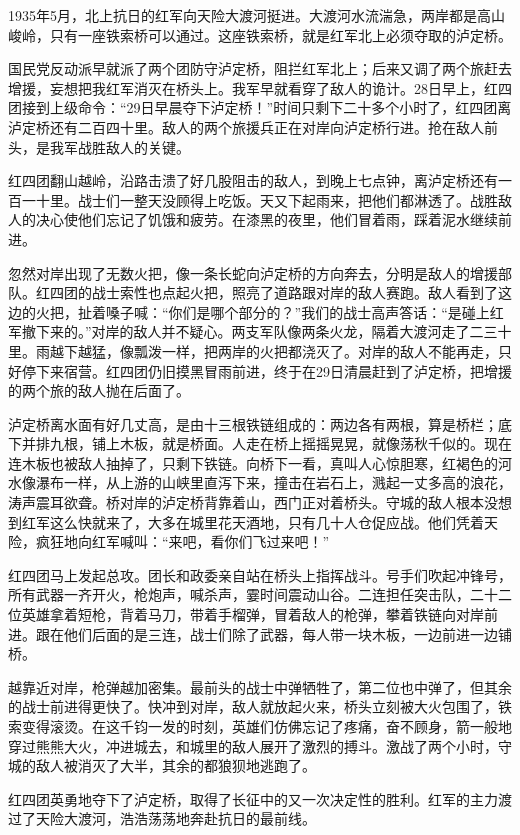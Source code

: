 \documentclass[12pt,UTF-8,openany]{ctexbook}
\begin{document}
\begin{Large}
    
    1935年5月，北上抗日的红军向天险大渡河挺进。大渡河水流湍急，两岸都是高山峻岭，只有一座铁索桥可以通过。这座铁索桥，就是红军北上必须夺取的泸定桥。
    
    国民党反动派早就派了两个团防守泸定桥，阻拦红军北上；后来又调了两个旅赶去增援，妄想把我红军消灭在桥头上。我军早就看穿了敌人的诡计。28日早上，红四团接到上级命令：“29日早晨夺下泸定桥！”时间只剩下二十多个小时了，红四团离泸定桥还有二百四十里。敌人的两个旅援兵正在对岸向泸定桥行进。抢在敌人前头，是我军战胜敌人的关键。
    
    红四团翻山越岭，沿路击溃了好几股阻击的敌人，到晚上七点钟，离泸定桥还有一百一十里。战士们一整天没顾得上吃饭。天又下起雨来，把他们都淋透了。战胜敌人的决心使他们忘记了饥饿和疲劳。在漆黑的夜里，他们冒着雨，踩着泥水继续前进。
    
    忽然对岸出现了无数火把，像一条长蛇向泸定桥的方向奔去，分明是敌人的增援部队。红四团的战士索性也点起火把，照亮了道路跟对岸的敌人赛跑。敌人看到了这边的火把，扯着嗓子喊：“你们是哪个部分的？”我们的战士高声答话：“是碰上红军撤下来的。”对岸的敌人并不疑心。两支军队像两条火龙，隔着大渡河走了二三十里。雨越下越猛，像瓢泼一样，把两岸的火把都浇灭了。对岸的敌人不能再走，只好停下来宿营。红四团仍旧摸黑冒雨前进，终于在29日清晨赶到了泸定桥，把增援的两个旅的敌人抛在后面了。
    
    泸定桥离水面有好几丈高，是由十三根铁链组成的：两边各有两根，算是桥栏；底下并排九根，铺上木板，就是桥面。人走在桥上摇摇晃晃，就像荡秋千似的。现在连木板也被敌人抽掉了，只剩下铁链。向桥下一看，真叫人心惊胆寒，红褐色的河水像瀑布一样，从上游的山峡里直泻下来，撞击在岩石上，溅起一丈多高的浪花，涛声震耳欲聋。桥对岸的泸定桥背靠着山，西门正对着桥头。守城的敌人根本没想到红军这么快就来了，大多在城里花天酒地，只有几十人仓促应战。他们凭着天险，疯狂地向红军喊叫：“来吧，看你们飞过来吧！”
    
    红四团马上发起总攻。团长和政委亲自站在桥头上指挥战斗。号手们吹起冲锋号，所有武器一齐开火，枪炮声，喊杀声，霎时间震动山谷。二连担任突击队，二十二位英雄拿着短枪，背着马刀，带着手榴弹，冒着敌人的枪弹，攀着铁链向对岸前进。跟在他们后面的是三连，战士们除了武器，每人带一块木板，一边前进一边铺桥。
    
    越靠近对岸，枪弹越加密集。最前头的战士中弹牺牲了，第二位也中弹了，但其余的战士前进得更快了。快冲到对岸，敌人就放起火来，桥头立刻被大火包围了，铁索变得滚烫。在这千钧一发的时刻，英雄们仿佛忘记了疼痛，奋不顾身，箭一般地穿过熊熊大火，冲进城去，和城里的敌人展开了激烈的搏斗。激战了两个小时，守城的敌人被消灭了大半，其余的都狼狈地逃跑了。
    
    红四团英勇地夺下了泸定桥，取得了长征中的又一次决定性的胜利。红军的主力渡过了天险大渡河，浩浩荡荡地奔赴抗日的最前线。
    
\end{Large}
\end{document}
